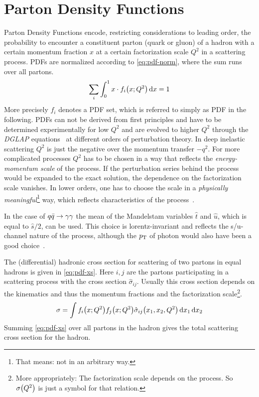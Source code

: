 \section{Parton Density Functions}%
\label{sec:pdf_basics}

Parton Density Functions encode, restricting considerations to leading
order, the probability to encounter a constituent parton (quark or
gluon) of a hadron with a certain momentum fraction \(x\) at a certain
factorization scale \(Q^2\) in a scattering process. PDFs are
normalized according to \cref{eq:pdf-norm}, where the sum runs over
all partons.
%
\begin{equation}
  \label{eq:pdf-norm}
  \sum_i\int_0^1x\cdot f_i\qty(x;Q^2) \dd{x} = 1
\end{equation}
%
More precisely \({f_i}\) denotes a PDF set, which is referred to
simply as PDF in the following.  PDFs can not be derived from first
principles and have to be determined experimentally for low \(Q^2\)
and are evolved to higher \(Q^2\) through the \emph{DGLAP}
equations~\cite{altarelli:1977af} at different orders of perturbation
theory.  In deep inelastic scattering \(Q^2\) is just the negative
over the momentum transfer \(-q^2\). For more complicated processes
\(Q^2\) has to be chosen in a way that reflects the
\emph{energy-momentum scale} of the process. If the perturbation
series behind the process would be expanded to the exact solution, the
dependence on the factorization scale vanishes. In lower orders, one
has to choose the scale in a \emph{physically
  meaningful}\footnote{That means: not in an arbitrary way.} way,
which reflects characteristics of the process~\cite{altarelli:1977af}.

In the case of \(q\bar{q}\rightarrow\gamma\gamma\) the mean of the Mandelstam variables
\(\hat{t}\) and \(\hat{u}\), which is equal to \(\hat{s}/2\), can be
used. This choice is lorentz-invariant and reflects the s/u-channel
nature of the process, although the \(p_\mathrm{T}\) of photon would also have
been a good choice~\cite[18]{buckley:2011ge}.

The (differential) hadronic cross section for scattering of two
partons in equal hadrons is given in \cref{eq:pdf-xs}. Here \(i,j\)
are the partons participating in a scattering process with the cross
section \(\hat{\sigma}_{ij}\). Usually this cross section depends on
the kinematics and thus the momentum fractions and the factorization
scale\footnote{More appropriately: The factorization scale depends on
  the process. So \(\sigma\qty(Q^2)\) is just a symbol for that
  relation.}.
%
\begin{equation}
  \label{eq:pdf-xs}
  \sigma = \int f_i\qty(x;Q^2) f_j\qty(x;Q^2) \hat{\sigma}_{ij}\qty(x_1,
  x_2, Q^2)\dd{x_1}\dd{x_2}
\end{equation}
%
Summing \cref{eq:pdf-xs} over all partons in the hadron gives
the total scattering cross section for the hadron.

